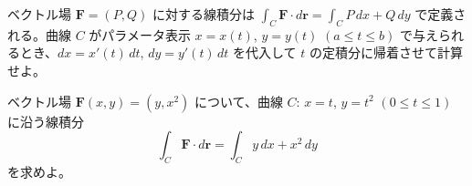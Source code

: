 
ベクトル場 $\bm{F} = (P, Q)$ に対する線積分は $\displaystyle\int_{C} \bm{F}\cdot d\bm{r} = \int_{C} P\,dx + Q\,dy$ で定義される。曲線 $C$ がパラメータ表示 $x = x(t)$, $y = y(t)$ $(a \le t \le b)$ で与えられるとき、$dx = x'(t)\,dt$, $dy = y'(t)\,dt$ を代入して $t$ の定積分に帰着させて計算せよ。

ベクトル場 $\bm{F}(x,y) = (y, x^{2})$ について、曲線 $C$: $x = t$, $y = t^{2}$ $(0 \le t \le 1)$ に沿う線積分
\[
\int_{C} \bm{F}\cdot d\bm{r} = \int_{C} y\,dx + x^{2}\,dy
\]
を求めよ。
